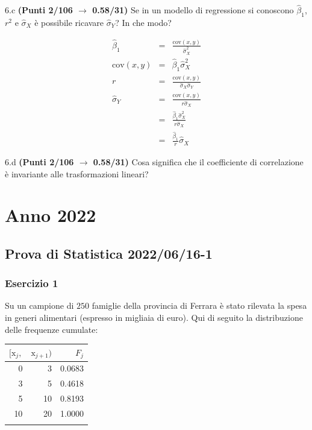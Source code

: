 \documentclass[
  11pt,
]{book}
\theoremstyle{mytheoremstyle}
\theoremstyle{mydefstyle}
\newenvironment{sol}
  {
  \begin{tcolorbox}[enhanced,breakable,arc=0.1mm,boxrule=1pt,colback=white,colframe=iblue,
  title=\bf \fontfamily{lmss}\selectfont \hspace{.5 cm} Soluzione,drop fuzzy shadow]

}{
\end{tcolorbox}
  }
\begin{document}
6.c \textbf{(Punti 2/106 \(\rightarrow\) 0.58/31)} Se in un modello di regressione si conoscono \(\hat\beta_1\), \(r^2\) e \(\hat\sigma_X\) è possibile ricavare \(\hat\sigma_Y\)? In che modo?

\begin{sol}
\begin{eqnarray*}
   \hat\beta_1 &=& \frac{\text{cov}(x,y)}{\hat\sigma_X^2}\\
   \text{cov}(x,y)&=&\hat\beta_1\hat\sigma_X^2\\
   r&=&\frac{\text{cov}(x,y)}{\hat\sigma_X\hat\sigma_Y}\\
   \hat\sigma_Y&=&\frac{\text{cov}(x,y)}{r\hat\sigma_X}\\
   &=&\frac{\hat\beta_1\hat\sigma_X^2}{r\hat\sigma_X}\\
   &=&\frac{\hat\beta_1}{r}\hat\sigma_X
\end{eqnarray*}

\end{sol}

6.d \textbf{(Punti 2/106 \(\rightarrow\) 0.58/31)} Cosa significa che il coefficiente di correlazione è invariante alle trasformazioni lineari?

\chapter{Anno 2022}\label{anno-2022}

\section{Prova di Statistica 2022/06/16-1}\label{prova-di-statistica-20220616-1}

\subsection{Esercizio 1}\label{esercizio-1-10}

Su un campione di \(250\) famiglie della provincia di Ferrara è stato rilevata la spesa in generi alimentari (espresso in migliaia di euro). Qui di seguito la distribuzione delle frequenze cumulate:

\begin{sol}

\begin{table}[H]
\centering
\begin{tabular}{rrr}
\toprule
$[\text{x}_j,$ & $\text{x}_{j+1})$ & $F_j$\\
\midrule
0 & 3 & 0.0683\\
3 & 5 & 0.4618\\
5 & 10 & 0.8193\\
10 & 20 & 1.0000\\
 &  & \\
\bottomrule
\end{tabular}
\end{table}

\end{sol}
\end{document}
